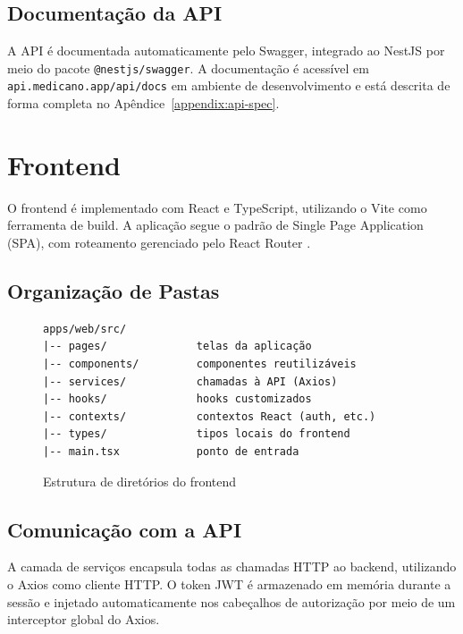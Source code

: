 \subsection{Documentação da API}
\label{subsec:swagger}

A API é documentada automaticamente pelo Swagger,
integrado ao NestJS por meio do pacote
\texttt{@nestjs/swagger}. A documentação é acessível
em \texttt{api.medicano.app/api/docs} em ambiente
de desenvolvimento e está descrita de forma completa
no Apêndice~\ref{appendix:api-spec}.

\section{Frontend}
\label{sec:frontend}

O frontend é implementado com React e TypeScript,
utilizando o Vite como ferramenta de build. A
aplicação segue o padrão de Single Page Application
(SPA), com roteamento gerenciado pelo React Router
\cite{reactdev2024}.

\subsection{Organização de Pastas}
\label{subsec:frontend-structure}

\begin{figure}[H]
  \centering
  \caption{Estrutura de diretórios do frontend}
  \label{fig:frontend-structure}
\begin{verbatim}
apps/web/src/
|-- pages/              telas da aplicação
|-- components/         componentes reutilizáveis
|-- services/           chamadas à API (Axios)
|-- hooks/              hooks customizados
|-- contexts/           contextos React (auth, etc.)
|-- types/              tipos locais do frontend
|-- main.tsx            ponto de entrada
\end{verbatim}
\end{figure}

\subsection{Comunicação com a API}
\label{subsec:api-communication}

A camada de serviços encapsula todas as chamadas
HTTP ao backend, utilizando o Axios como cliente
HTTP. O token JWT é armazenado em memória durante
a sessão e injetado automaticamente nos cabeçalhos
de autorização por meio de um interceptor global
do Axios.

